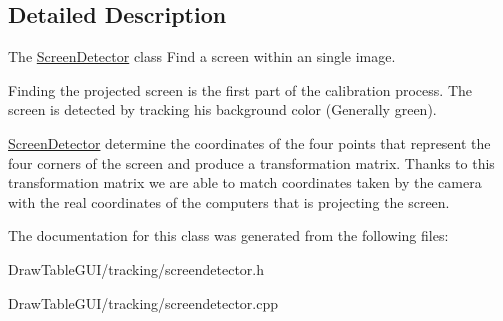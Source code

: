 \subsection{Detailed Description}
The \hyperlink{classScreenDetector}{Screen\+Detector} class Find a screen within an single image. 

Finding the projected screen is the first part of the calibration process. The screen is detected by tracking his background color (Generally green).

\hyperlink{classScreenDetector}{Screen\+Detector} determine the coordinates of the four points that represent the four corners of the screen and produce a transformation matrix. Thanks to this transformation matrix we are able to match coordinates taken by the camera with the real coordinates of the computers that is projecting the screen. 

The documentation for this class was generated from the following files\+:\begin{DoxyCompactItemize}
\item 
Draw\+Table\+G\+U\+I/tracking/screendetector.\+h\item 
Draw\+Table\+G\+U\+I/tracking/screendetector.\+cpp\end{DoxyCompactItemize}
